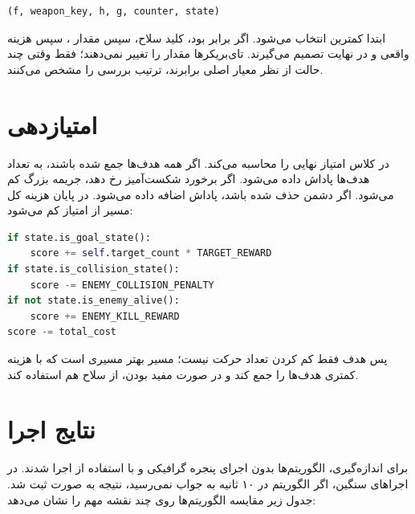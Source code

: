 \documentclass[10.5pt]{exam}
\begin{document}
\begin{latin}
\begin{lstlisting}[language=Python]
(f, weapon_key, h, g, counter, state)
\end{lstlisting}
\end{latin}

ابتدا کمترین
انتخاب می‌شود. اگر برابر بود، کلید سلاح، سپس مقدار
، سپس هزینه واقعی
و در نهایت
تصمیم می‌گیرند. تای‌بریکرها مقدار
را تغییر نمی‌دهند؛ فقط وقتی چند حالت از نظر معیار اصلی برابرند، ترتیب بررسی را مشخص می‌کنند.

\section{امتیازدهی}
در
کلاس
امتیاز نهایی را محاسبه می‌کند. اگر همه هدف‌ها جمع شده باشند، به تعداد هدف‌ها پاداش داده می‌شود. اگر برخورد شکست‌آمیز رخ دهد، جریمه بزرگ کم می‌شود. اگر دشمن حذف شده باشد، پاداش اضافه داده می‌شود. در پایان هزینه کل مسیر از امتیاز کم می‌شود:

\begin{latin}
\begin{lstlisting}[language=Python]
if state.is_goal_state():
    score += self.target_count * TARGET_REWARD
if state.is_collision_state():
    score -= ENEMY_COLLISION_PENALTY
if not state.is_enemy_alive():
    score += ENEMY_KILL_REWARD
score -= total_cost
\end{lstlisting}
\end{latin}

پس هدف فقط کم کردن تعداد حرکت نیست؛ مسیر بهتر مسیری است که با هزینه کمتری هدف‌ها را جمع کند و در صورت مفید بودن، از سلاح هم استفاده کند.

\section{نتایج اجرا}
برای اندازه‌گیری، الگوریتم‌ها بدون اجرای پنجره گرافیکی و با استفاده از
اجرا شدند. در اجراهای سنگین، اگر الگوریتم در ۱۰ ثانیه به جواب نمی‌رسید، نتیجه به صورت
ثبت شد. جدول زیر مقایسه الگوریتم‌ها روی چند نقشه مهم را نشان می‌دهد:
\end{document}
